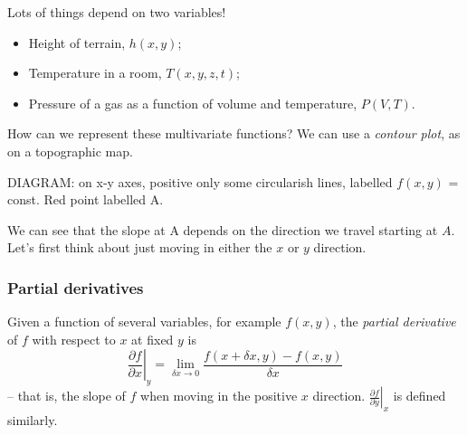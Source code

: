\documentclass{../../template/note}
\begin{document}
    \begin{example}
        Lots of things depend on two variables!
        \begin{itemize}
            \item Height of terrain, \(h(x,y)\);
            \item Temperature in a room, \(T(x, y, z, t)\);
            \item Pressure of a gas as a function of volume and temperature, \(P(V, T)\).
        \end{itemize}
        
        
    \end{example}
    
    How can we represent these multivariate functions? We can use a \emph{contour plot}, as on a topographic map.

    DIAGRAM: on x-y axes, positive only some circularish lines, labelled \(f(x, y)\) = const. Red point labelled A.

    We can see that the slope at A depends on the direction we travel starting at \(A\). Let's first think about just moving in either the \(x\) or \(y\) direction.

    \subsubsection{Partial derivatives}

    \begin{definition}
        Given a function of several variables, for example \(f(x,y)\), the \emph{partial derivative} of \(f\) with respect to \(x\) at fixed \(y\) is
        \[
            \left.\frac{\partial f}{\partial x}\right|_y = \lim_{\delta x \to 0} \frac{f(x+\delta x, y)-f(x, y)}{\delta x}
        \]
        -- that is, the slope of \(f\) when moving in the positive \(x\) direction. \(\left.\frac{\partial f}{\partial y}\right|_x \) is defined similarly.
    \end{definition}
    
\end{document}
